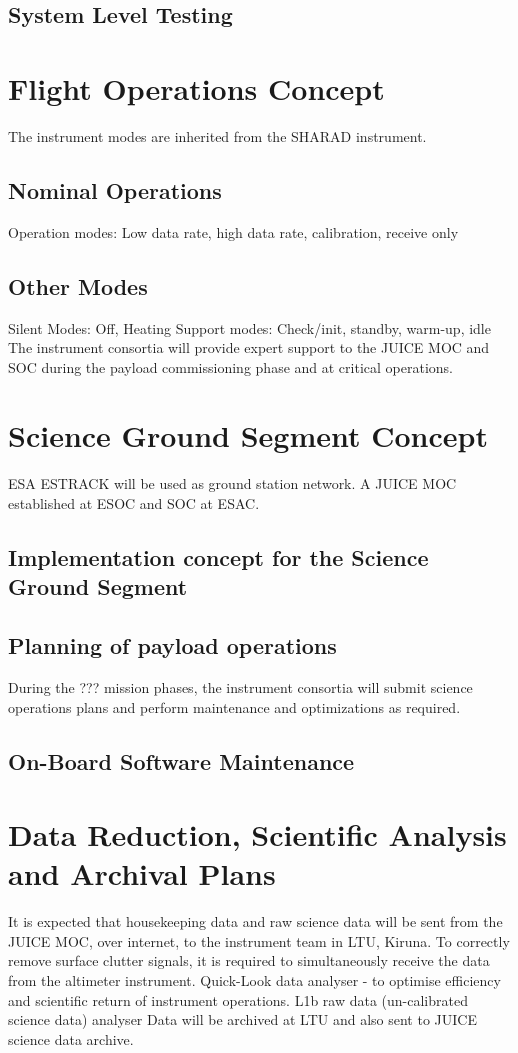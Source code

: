 \subsection{System Level Testing}
%
\section{Flight Operations Concept}
%
The instrument modes are inherited from the SHARAD instrument\cite{SHARAD_ppt}.
%
\subsection{Nominal Operations}
%
Operation modes: Low data rate, high data rate, calibration, receive only
%
\subsection{Other Modes}
%
Silent Modes: Off, Heating
Support modes: Check/init, standby, warm-up, idle
%
The instrument consortia will provide expert support to the JUICE \ac{MOC} and \ac{SOC} during the payload commissioning phase and at critical operations.
%
\section{Science Ground Segment Concept}
ESA ESTRACK will be used as ground station network. A JUICE \ac{MOC} established at ESOC and \ac{SOC} at ESAC.

\subsection{Implementation concept for the Science Ground Segment}
\subsection{Planning of payload operations}
During the ??? mission phases, the instrument consortia will submit science operations plans and perform maintenance and optimizations as required.
\subsection{On-Board Software Maintenance}
%
\section{Data Reduction, Scientific Analysis and Archival Plans}
It is expected that housekeeping data and raw science data will be sent from the JUICE \ac{MOC}, over internet, to the instrument team in LTU, Kiruna. To correctly remove surface clutter signals, it is required to simultaneously receive the data from the altimeter instrument. 
Quick-Look data analyser - to optimise efficiency and scientific return of instrument operations.
L1b raw data (un-calibrated science data) analyser
Data will be archived at LTU and also sent to JUICE science data archive.
%

